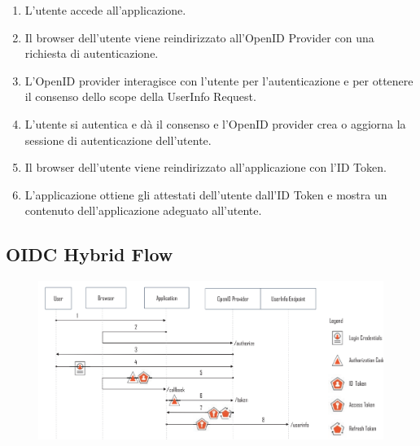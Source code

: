 \begin{enumerate}
    \item L'utente accede all'applicazione.
    \item Il browser dell'utente viene reindirizzato all'OpenID Provider con una
          richiesta di autenticazione.
    \item L'OpenID provider interagisce con l'utente per l'autenticazione e per
          ottenere il consenso dello scope della UserInfo Request.
    \item L'utente si autentica e dà il consenso e l'OpenID provider crea o aggiorna
          la sessione di autenticazione dell'utente.
    \item Il browser dell'utente viene reindirizzato all'applicazione con l'ID Token.
    \item L'applicazione ottiene gli attestati dell'utente dall'ID Token e mostra un
          contenuto dell'applicazione adeguato all'utente.
\end{enumerate}

\subsection{OIDC Hybrid Flow}

\begin{figure}[H]
    \centering
    \includegraphics[width=\textwidth, keepaspectratio]{capitoli/id_managing/imgs/hybridflow.png}
\end{figure}


